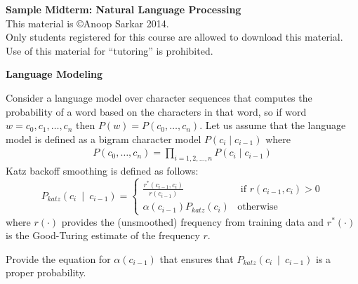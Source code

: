 \documentclass[11pt]{article}
\begin{document}

\begin{center}
{\Large\bf Sample Midterm: Natural Language Processing }\\
This material is \copyright Anoop Sarkar 2014. \\
Only students registered for this course are allowed to download this material. \\
Use of this material for ``tutoring'' is prohibited.
\end{center}

\begin{exe}

\ex \textbf{Language Modeling}

Consider a language model over character sequences that computes the probability of
a word based on the characters in that word, so if word $w = c_0, c_1, \ldots, c_n$ then
$P(w) = P(c_0, \ldots, c_n)$. Let us assume that the language model is defined as
a bigram character model $P(c_i \mid c_{i-1})$ where 
\begin{eqnarray*} 
P(c_0, \ldots, c_n) = \prod_{i=1,2,\ldots,n} P(c_i \mid c_{i-1}) \label{eqn:bigram} 
\end{eqnarray*}
Katz backoff smoothing is defined as follows:
\[ P_{\textit{katz}}(c_i~\mid~c_{i-1}) = \left\{
\begin{array}{cl}
\frac{ r^\ast(c_{i-1}, c_i) }{ r(c_{i-1}) } & \textrm{ if $r(c_{i-1}, c_i) > 0$} \\
\alpha(c_{i-1}) P_{\textit{katz}} (c_i) & \textrm{otherwise}
\end{array}
\right. \]
where $r(\cdot)$ provides the (unsmoothed) frequency from training data and $r^\ast(\cdot)$ is the Good-Turing estimate of the frequency $r$.
%
%

Provide the equation for $\alpha(c_{i-1})$ that ensures that $P_{\textit{katz}}(c_i~\mid~c_{i-1})$ is a proper probability.


\end{exe}
\end{document}
